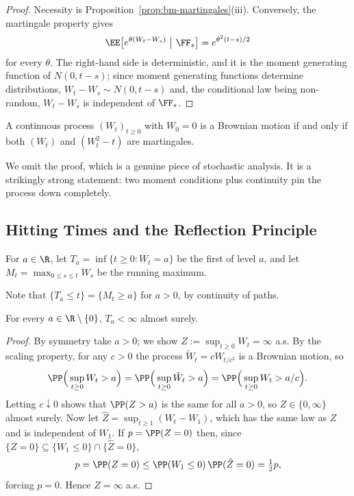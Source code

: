 \begin{proof}
	Necessity is Proposition~\ref{prop:bm-martingales}(iii). Conversely, the martingale property gives
	$$
	\EE\big[e^{\theta(W_t - W_s)}\ \big|\ \FF_s\big] = e^{\theta^2(t-s)/2}
	$$
	for every $\theta$. The right-hand side is deterministic, and it is the moment generating function of $N(0,t-s)$; since moment generating functions determine distributions, $W_t - W_s\sim N(0,t-s)$ and, the conditional law being non-random, $W_t-W_s$ is independent of $\FF_s$.
\end{proof}

\begin{theorem}
	A continuous process $(W_t)_{t\geq0}$ with $W_0=0$ is a Brownian motion if and only if both $(W_t)$ and $(W_t^2-t)$ are martingales.
\end{theorem}

We omit the proof, which is a genuine piece of stochastic analysis. It is a strikingly strong statement: two moment conditions plus continuity pin the process down completely.

\subsection{Hitting Times and the Reflection Principle}

\begin{definition}
	For $a \in \R$, let $T_a = \inf\{t\geq0 : W_t = a\}$ be the first  of level $a$, and let $M_t = \max_{0\leq s\leq t}W_s$ be the running maximum.
\end{definition}

Note that $\{T_a \leq t\} = \{M_t \geq a\}$ for $a>0$, by continuity of paths.

\begin{theorem}\label{thm:hit-finite}
	For every $a \in \R\setminus\{0\}$, $T_a < \infty$ almost surely.
\end{theorem}

\begin{proof}
	By symmetry take $a > 0$; we show $Z := \sup_{t\geq0}W_t = \infty$ a.s. By the scaling property, for any $c>0$ the process $\tilde W_t = cW_{t/c^2}$ is a Brownian motion, so
	$$
	\PP\Big(\sup_{t\geq0}W_t > a\Big) = \PP\Big(\sup_{t\geq0}\tilde W_t > a\Big) = \PP\Big(\sup_{t\geq0}W_t > a/c\Big).
	$$
	Letting $c \downarrow 0$ shows that $\PP(Z>a)$ is the same for all $a>0$, so $Z \in \{0,\infty\}$ almost surely. Now let $\hat Z = \sup_{t\geq1}(W_t - W_1)$, which has the same law as $Z$ and is independent of $W_1$. If $p = \PP(Z = 0)$ then, since $\{Z=0\}\subseteq\{W_1\leq0\}\cap\{\hat Z = 0\}$,
	$$
	p = \PP(Z=0) \leq \PP(W_1\leq0)\,\PP(\hat Z = 0) = \tfrac12 p,
	$$
	forcing $p = 0$. Hence $Z = \infty$ a.s.
\end{proof}


